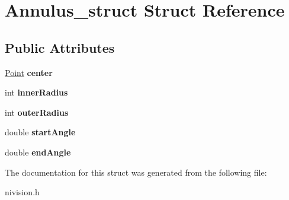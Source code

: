 \hypertarget{structAnnulus__struct}{
\section{Annulus\_\-struct Struct Reference}
\label{structAnnulus__struct}
}
\subsection*{Public Attributes}
\begin{DoxyCompactItemize}
\item 
\hypertarget{structAnnulus__struct_ad4e0a22665f21e1437cfbf1bbd6004cc}{
\hyperlink{structPoint__struct}{Point} {\bfseries center}}
\label{structAnnulus__struct_ad4e0a22665f21e1437cfbf1bbd6004cc}

\item 
\hypertarget{structAnnulus__struct_aa068fa116e479be1dcc3db4da4a50235}{
int {\bfseries innerRadius}}
\label{structAnnulus__struct_aa068fa116e479be1dcc3db4da4a50235}

\item 
\hypertarget{structAnnulus__struct_ab30c506ce1fbf6fcb7550f92b945904c}{
int {\bfseries outerRadius}}
\label{structAnnulus__struct_ab30c506ce1fbf6fcb7550f92b945904c}

\item 
\hypertarget{structAnnulus__struct_ad5682c289e82034abd619bd01dfcd912}{
double {\bfseries startAngle}}
\label{structAnnulus__struct_ad5682c289e82034abd619bd01dfcd912}

\item 
\hypertarget{structAnnulus__struct_a57c921016268890aff96637b20530d8c}{
double {\bfseries endAngle}}
\label{structAnnulus__struct_a57c921016268890aff96637b20530d8c}

\end{DoxyCompactItemize}


The documentation for this struct was generated from the following file:\begin{DoxyCompactItemize}
\item 
nivision.h\end{DoxyCompactItemize}
